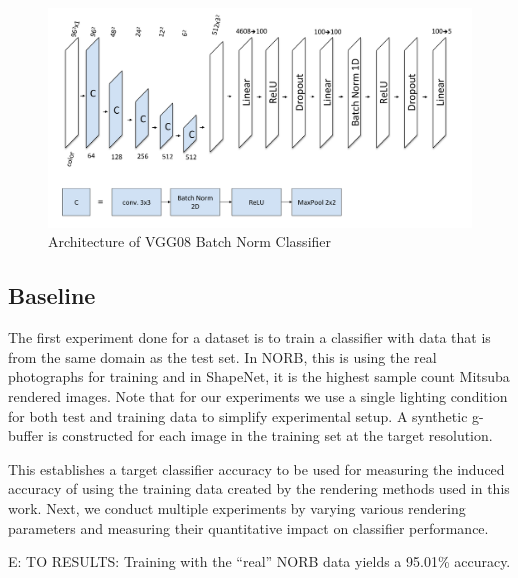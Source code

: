 \documentclass[10pt,twocolumn,letterpaper]{article}
\newcommand{\edit}[1]{{\color{red} E: #1}}
\begin{document}
\begin{figure}[h!]
\centering
\includegraphics[width=1.0\columnwidth]{./assets/vgg08_diagram.pdf}
\caption{Architecture of VGG08 Batch Norm Classifier}
\label{fig:VGG_DAIGRAM}
\end{figure}

\subsection{Baseline}
The first experiment done for a dataset is to train a classifier with data that is from the same domain as the test set.  In NORB, this is using the real photographs for training and in ShapeNet, it is the highest sample count Mitsuba rendered images. 
Note that for our experiments we use a single lighting condition for both test and training data to simplify experimental setup.  
A synthetic g-buffer is constructed for each image in the training set at the target resolution.

This establishes a target classifier accuracy to be used for measuring the induced accuracy of using the training data created by the rendering methods used in this work. Next, we conduct multiple experiments by varying various rendering parameters and measuring their quantitative impact on classifier performance.  %

\edit{TO RESULTS: Training with the ``real'' NORB data yields a 95.01\% accuracy.}
\end{document}

